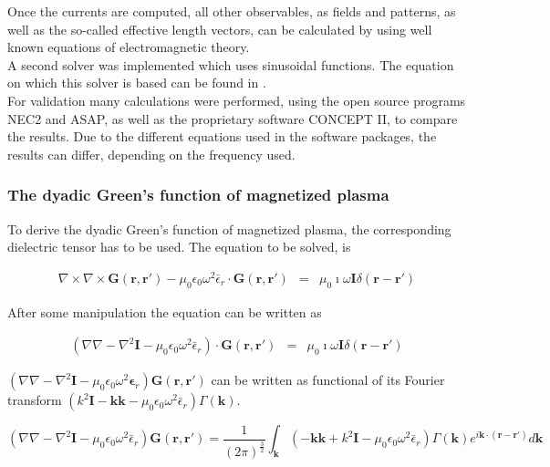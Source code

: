 \documentclass[a4paper,11pt]{article}
\begin{document}
Once the currents are computed, all other observables, as fields and patterns, as well as the so-called effective length vectors, can be calculated by using well known equations of electromagnetic theory.\\

A second solver was implemented which uses sinusoidal functions. The equation on which this solver is based can be found in \cite{davidson}.\\

For validation many calculations were performed, using the open source programs NEC2 and ASAP, as well as the proprietary software CONCEPT II, to compare the results. Due to the different equations used in the software packages, the results can differ, depending on the frequency used.

\subsubsection{The dyadic Green's function of magnetized plasma}
To derive the dyadic Green's function of magnetized plasma, the corresponding dielectric tensor has to be used. The equation to be solved, is

\begin{eqnarray}
 \nabla \times \nabla \times  \mathbf{G}(\mathbf{r},\mathbf{r'}) -   \mu_0 \epsilon_0 \omega^2 \bar{\epsilon}_r\cdot  \mathbf{G}(\mathbf{r},\mathbf{r'})  &=& \mu_0 \imath \omega \mathbf{I}  \delta (\mathbf{r}-\mathbf{r'})
\end{eqnarray}

After some manipulation the equation can be written as


\begin{eqnarray}
 \left( \nabla \nabla - \nabla^2 \mathbf{I} -  \mu_0 \epsilon_0 \omega^2 \bar{\epsilon}_r \right) \cdot  \mathbf{G}(\mathbf{r},\mathbf{r'})  &=& \mu_0 \imath \omega \mathbf{I}  \delta (\mathbf{r}-\mathbf{r'})
\end{eqnarray}

$\left( \nabla \nabla - \nabla^2 \mathbf{I} -  \mu_0 \epsilon_0 \omega^2 \mathbf{\epsilon}_r\right)\mathbf{G}(\mathbf{r},\mathbf{r'})$ can be written as functional of its Fourier transform $\left( k^2 \mathbf{I} -\mathbf{kk}  -   \mu_0 \epsilon_0 \omega^2 \bar{\epsilon}_r\right)\Gamma(\mathbf{k})$.

\begin{equation}
    \left( \nabla \nabla - \nabla^2 \mathbf{I} -  \mu_0 \epsilon_0 \omega^2 \bar{\epsilon}_r\right)\mathbf{G}(\mathbf{r},\mathbf{r'})=\frac{1}{(2\pi )^{\frac{3}{2}}} \int_{\mathbf{k}} \left( -\mathbf{kk} + k^2 \mathbf{I} -   \mu_0 \epsilon_0 \omega^2 \bar{\epsilon}_r\right) \Gamma(\mathbf{k}) e^{i\mathbf{k}\cdot (\mathbf{r}-\mathbf{r'})} d\mathbf{k}
\end{equation}
\end{document}
